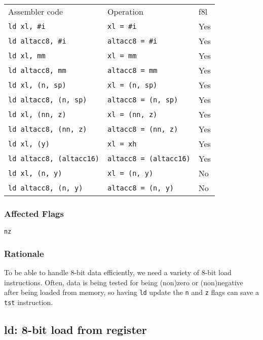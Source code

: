 \documentclass{book}
\begin{document}
\begin{tabular}{l l l}
Assembler code                  & Operation                     & f8l \\
\texttt{ld xl, \#i}             & \texttt{xl = \#i}             & Yes \\
\texttt{ld altacc8, \#i}        & \texttt{altacc8 = \#i}        & Yes \\
\texttt{ld xl, mm}              & \texttt{xl = mm}              & Yes \\
\texttt{ld altacc8, mm}         & \texttt{altacc8 = mm}         & Yes \\
\texttt{ld xl, (n, sp)}         & \texttt{xl = (n, sp)}         & Yes \\
\texttt{ld altacc8, (n, sp)}    & \texttt{altacc8 = (n, sp)}    & Yes \\
\texttt{ld xl, (nn, z)}         & \texttt{xl = (nn, z)}         & Yes \\
\texttt{ld altacc8, (nn, z)}    & \texttt{altacc8 = (nn, z)}    & Yes \\
\texttt{ld xl, (y)}             & \texttt{xl = xh}              & Yes \\
\texttt{ld altacc8, (altacc16)} & \texttt{altacc8 = (altacc16)} & Yes \\
\texttt{ld xl, (n, y)}          & \texttt{xl = (n, y)}          & No \\
\texttt{ld altacc8, (n, y)}     & \texttt{altacc8 = (n, y)}     & No \\
\end{tabular}

\subsubsection*{Affected Flags}

\texttt{nz}

\subsubsection*{Rationale}

To be able to handle 8-bit data efficiently, we need a variety of 8-bit load instructions. Often, data is being tested for being (non)zero or (non)negative after being loaded from memory, so having \texttt{ld} update the \texttt{n} and \texttt{z} flags can save a \texttt{tst} instruction.


\subsection{ld: 8-bit load from register}
\end{document}
